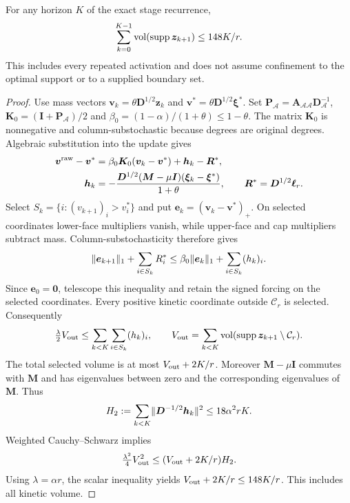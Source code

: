 \begin{theorem}
\label{thm:det-op2-volume}
For any horizon $K$ of the exact stage recurrence,
\[
 \sum_{k=0}^{K-1}\operatorname{vol}(\operatorname{supp}\bm{z}_{k+1})\leq148K/r.
\]
This includes every repeated activation and does not assume confinement to
the optimal support or to a supplied boundary set.
\end{theorem}
\begin{proof}
Use mass vectors $\bm{v}_k=\theta\bm{D}^{1/2}\bm{z}_k$ and
$\bm{v}^*=\theta\bm{D}^{1/2}\bm{\xi}^*$.
Set $\bm{P}_{\mathcal A}=\bm{A}_{\mathcal A\mathcal A}\bm{D}_{\mathcal A}^{-1}$,
$\bm{K}_0=(\bm{I}+\bm{P}_{\mathcal A})/2$ and
$\beta_0=(1-\alpha)/(1+\theta)\leq1-\theta$.
The matrix $\bm{K}_0$ is nonnegative and column-substochastic because
degrees are original degrees. Algebraic substitution into the update gives
\begin{align*}
 \bm{v}^{\rm raw}-\bm{v}^*
       &=\beta_0\bm{K}_0(\bm{v}_k-\bm{v}^*)+\bm{h}_k-\bm{R}^*,\\
 \bm{h}_k&=-\frac{\bm{D}^{1/2}(\bm{M}-\mu\bm{I})
                  (\bm{\xi}_k-\bm{\xi}^*)}{1+\theta},\qquad
 \bm{R}^*=\bm{D}^{1/2}\bm{\ell}_r.
\end{align*}
Select $S_k=\{i:(v_{k+1})_i>v_i^*\}$ and put
$\bm{e}_k=(\bm{v}_k-\bm{v}^*)_+$.
On selected coordinates lower-face multipliers vanish, while upper-face
and cap multipliers subtract mass. Column-substochasticity therefore gives
\[
 \lVert\bm{e}_{k+1}\rVert_1+\sum_{i\in S_k}R_i^*
 \leq\beta_0\lVert\bm{e}_k\rVert_1+\sum_{i\in S_k}(h_k)_i.
\]
Since $\bm{e}_0=\bm{0}$, telescope this inequality and retain the signed
forcing on the selected coordinates. Every positive kinetic coordinate
outside $\mathcal C_r$ is selected. Consequently
\[
 \tfrac\lambda2 V_{\rm out}\leq\sum_{k<K}\sum_{i\in S_k}(h_k)_i,
 \qquad
 V_{\rm out}=\sum_{k<K}\operatorname{vol}(\operatorname{supp}\bm{z}_{k+1}\setminus\mathcal C_r).
\]
The total selected volume is at most $V_{\rm out}+2K/r$. Moreover
$\bm{M}-\mu\bm{I}$ commutes with $\bm{M}$ and has eigenvalues between zero
and the corresponding eigenvalues of $\bm{M}$. Thus
\[
 H_2:=\sum_{k<K}\lVert\bm{D}^{-1/2}\bm{h}_k\rVert^2
      \leq18\alpha^2rK.
\]
Weighted Cauchy--Schwarz implies
\[
 \tfrac{\lambda^2}{4}V_{\rm out}^2
       \leq(V_{\rm out}+2K/r)H_2.
\]
Using $\lambda=\alpha r$, the scalar inequality yields
$V_{\rm out}+2K/r\leq148K/r$. This includes all kinetic volume.
\end{proof}
